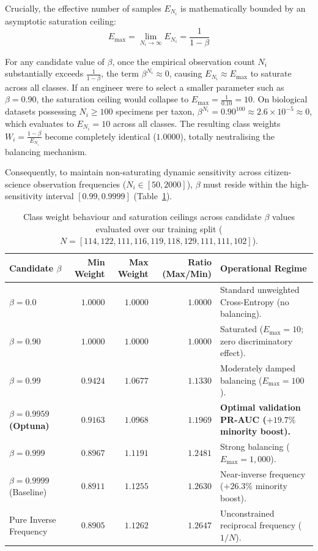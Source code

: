 Crucially, the effective number of samples $E_{N_i}$ is mathematically bounded by an asymptotic saturation ceiling:
\begin{equation}
  E_{\max} = \lim_{N_i \to \infty} E_{N_i} = \frac{1}{1 - \beta}
\end{equation}

For any candidate value of $\beta$, once the empirical observation count $N_i$ substantially exceeds $\frac{1}{1 - \beta}$, the term $\beta^{N_i} \approx 0$, causing $E_{N_i} \approx E_{\max}$ to saturate across all classes. If an engineer were to select a smaller parameter such as $\beta = 0.90$, the saturation ceiling would collapse to $E_{\max} = \frac{1}{0.10} = 10$. On biological datasets possessing $N_i \ge 100$ specimens per taxon, $\beta^{N_i} = 0.90^{100} \approx 2.6 \times 10^{-5} \approx 0$, which evaluates to $E_{N_i} = 10$ across all classes. The resulting class weights $W_i = \frac{1 - \beta}{E_{N_i}}$ become completely identical ($1.0000$), totally neutralising the balancing mechanism.

Consequently, to maintain non-saturating dynamic sensitivity across citizen-science observation frequencies ($N_i \in [50, 2000]$), $\beta$ must reside within the high-sensitivity interval $[0.99, 0.9999]$ (Table~\ref{tab:beta_comparison}).

\begin{table}[htbp]
\centering
\caption{Class weight behaviour and saturation ceilings across candidate $\beta$ values evaluated over our training split ($N = [114, 122, 111, 116, 119, 118, 129, 111, 111, 102]$).}
\label{tab:beta_comparison}
\begin{tabularx}{\textwidth}{@{}l r r r X@{}}
\toprule
\textbf{Candidate $\beta$} & \textbf{Min Weight} & \textbf{Max Weight} & \textbf{Ratio (Max/Min)} & \textbf{Operational Regime} \\
\midrule
$\beta = 0.0$ & $1.0000$ & $1.0000$ & $1.0000$ & Standard unweighted Cross-Entropy (no balancing). \\
$\beta = 0.90$ & $1.0000$ & $1.0000$ & $1.0000$ & Saturated ($E_{\max}=10$; zero discriminatory effect). \\
$\beta = 0.99$ & $0.9424$ & $1.0677$ & $1.1330$ & Moderately damped balancing ($E_{\max}=100$). \\
\textbf{$\beta = 0.9959$ (Optuna)} & \textbf{$0.9163$} & \textbf{$1.0968$} & \textbf{$1.1969$} & \textbf{Optimal validation PR-AUC ($+19.7\%$ minority boost).} \\
$\beta = 0.999$ & $0.8967$ & $1.1191$ & $1.2481$ & Strong balancing ($E_{\max}=1,000$). \\
$\beta = 0.9999$ (Baseline) & $0.8911$ & $1.1255$ & $1.2630$ & Near-inverse frequency ($+26.3\%$ minority boost). \\
Pure Inverse Frequency & $0.8905$ & $1.1262$ & $1.2647$ & Unconstrained reciprocal frequency ($1/N$). \\
\bottomrule
\end{tabularx}
\end{table}

